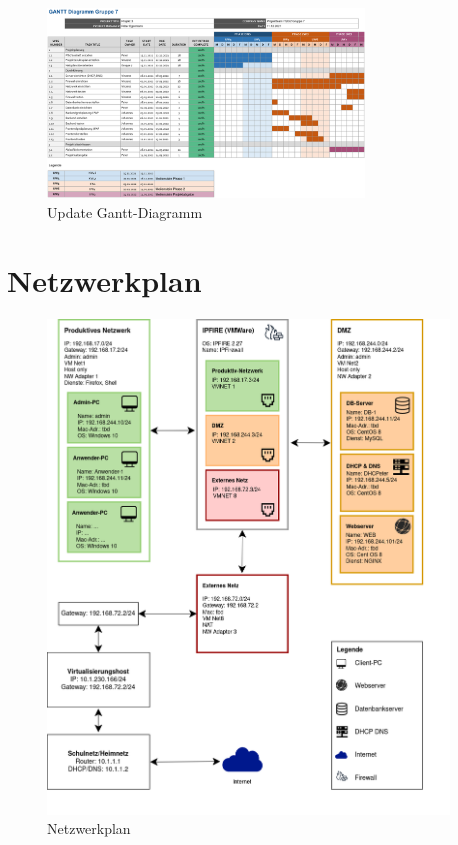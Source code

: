 \documentclass[a4paper,
    11pt,
    headings=small,
    ngerman,
    listof=totoc,
    numbers=noenddot]{scrreprt}[2021/11/13]
\begin{document}
\begin{figure}[h!]
  \centering
  \includegraphics[angle=90,origin=c,width=0.75\textwidth]{data/Gantt_Abschluss.png}
  \caption{Update Gantt-Diagramm}
  \label{fig:GanttUpdate}
\end{figure}



\chapter{Netzwerkplan}

\begin{figure}[h!]
  \centering
  \includegraphics[width=0.95\textwidth]{data/Netzwerkplan.png}
  \caption{Netzwerkplan}
  \label{fig:Netzwerkplan}
\end{figure}
\end{document}
